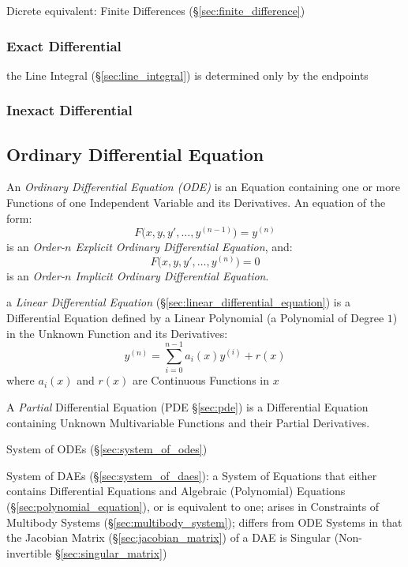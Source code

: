 \fist Dicrete equivalent: Finite Differences (\S\ref{sec:finite_difference})



\subsubsection{Exact Differential}\label{sec:exact_differential}

the Line Integral (\S\ref{sec:line_integral}) is determined only by the
endpoints



\subsubsection{Inexact Differential}\label{sec:inexact_differential}



\subsection{Ordinary Differential Equation}\label{sec:ode}

An \emph{Ordinary Differential Equation (ODE)} is an Equation containing one or
more Functions of one Independent Variable and its Derivatives. An equation of
the form:
\[
  F\Big(x,y,y',\ldots,y^{(n-1)}\Big) = y^{(n)}
\]
is an \emph{Order-$n$ Explicit Ordinary Differential Equation}, and:
\[
  F\Big(x,y,y',\ldots,y^{(n)}\Big) = 0
\]
is an \emph{Order-$n$ Implicit Ordinary Differential Equation}.

\fist a \emph{Linear Differential Equation}
(\S\ref{sec:linear_differential_equation}) is a Differential Equation defined
by a Linear Polynomial (a Polynomial of Degree $1$) in the Unknown Function and
its Derivatives:
\[
  y^{(n)} = \sum_{i=0}^{n-1} a_i (x) y^{(i)} + r(x)
\]
where $a_i(x)$ and $r(x)$ are Continuous Functions in $x$

\fist A \emph{Partial} Differential Equation (PDE
\S\ref{sec:pde}) is a Differential Equation
containing Unknown Multivariable Functions and their Partial Derivatives.

\fist System of ODEs (\S\ref{sec:system_of_odes})

\fist System of DAEs (\S\ref{sec:system_of_daes}): a System of Equations that
either contains Differential Equations and Algebraic (Polynomial) Equations
(\S\ref{sec:polynomial_equation}), or is equivalent to one; arises in
Constraints of Multibody Systems (\S\ref{sec:multibody_system}); differs from
ODE Systems in that the Jacobian Matrix (\S\ref{sec:jacobian_matrix}) of a DAE
is Singular (Non-invertible \S\ref{sec:singular_matrix})

